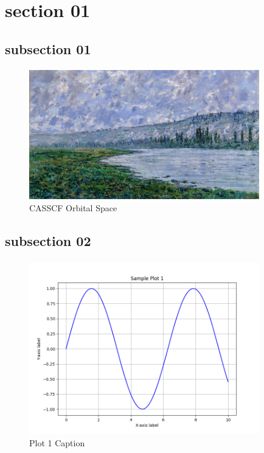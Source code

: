 \documentclass[class=book, crop=false]{standalone}
\begin{document}
\section{section 01}

\subsection{subsection 01}

\paragraph*{}
\blindtext

\paragraph*{}
\blindtext

\begin{figure}[htbp]
    \centering
    \includegraphics[width=10cm]{../../figures_and_plots/figures/claude_monet_painting.jpg}
    \caption{CASSCF Orbital Space}
    \label{fig:casscf_orbital_space}
\end{figure}

\subsection{subsection 02}

\paragraph*{}
\Blindtext

\begin{figure}[htbp]
    \centering
    \includegraphics[width=10cm]{../../figures_and_plots/plots/plot1.png}
    \caption{Plot 1 Caption}
    \label{fig:plot1}
\end{figure}
\end{document}
